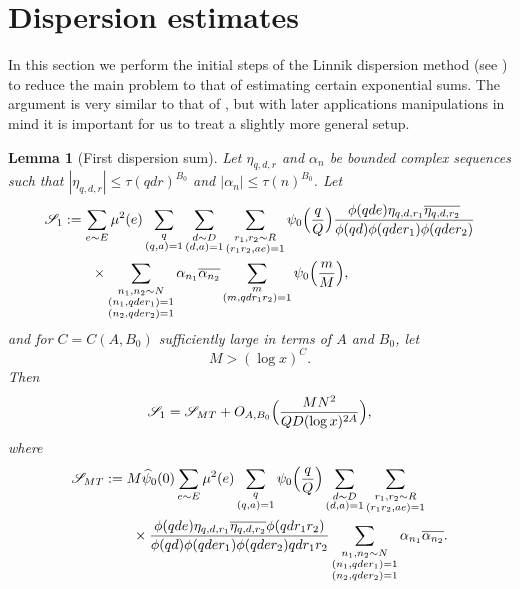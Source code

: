 \documentclass[10pt]{amsart}
\theoremstyle{plain}
\newtheorem{lmm}[thrm]{Lemma}
\numberwithin{equation}{section}
\renewcommand{\hat}[1]{\widehat #1}
\begin{document}
\section{Dispersion estimates}\label{sec:Dispersion}
%
%
%
%
In this section we perform the initial steps of the Linnik dispersion method (see \cite{Linnik}) to reduce the main problem to that of estimating certain exponential sums. The argument is very similar to that of \cite[\S3-\S7]{BFI1}, but with later applications manipulations in mind it is important for us to treat a slightly more general setup.
%
%
%
%
%
%
%
%
\begin{lmm}[First dispersion sum]\label{lmm:Dispersion1}
Let $\eta_{q,d,r}$ and $\alpha_n$ be bounded complex sequences such that $|\eta_{q,d,r}|\le \tau(q d r)^{B_0}$ and $|\alpha_n|\le \tau(n)^{B_0}$. Let
\begin{align*}
\mathscr{S}_{1}&:=\sum_{e\sim E}\mu^2(e) \sum_{\substack{q\\ (q,a)=1}}\sum_{\substack{d\sim D\\ (d,a)=1}}\sum_{\substack{r_1,r_2\sim R\\ (r_1r_2,a e)=1}}\psi_0\Bigl(\frac{q}{Q}\Bigr)\frac{\phi(q d e)\eta_{q,d,r_1}\overline{\eta_{q,d,r_2}} }{\phi(q d)\phi(q d e r_1)\phi(q d e r_2)}\\
&\qquad\times \sum_{\substack{n_1,n_2\sim N\\ (n_1,q d e r_1)=1\\(n_2,q d e r_2)=1}}\alpha_{n_1}\overline{\alpha_{n_2}}\sum_{\substack{m\\ (m,q d r_1 r_2)=1}} \psi_0\Bigl(\frac{m}{M}\Bigr),
\end{align*}
and for $C=C(A,B_0)$ sufficiently large in terms of $A$ and $B_0$, let
\[
M>(\log{x})^C.
\]
Then
\begin{equation*}
\mathscr{S}_{1}=\mathscr{S}_{MT}+O_{A,B_0}\Bigl(\frac{MN^2}{Q D(\log{x})^{2A}}\Bigr),\label{eq:S21Estimate}
\end{equation*}
where
\begin{align*}
\mathscr{S}_{MT}&:=M\hat{\psi}_0(0)\sum_{e\sim E}\mu^2(e)\sum_{\substack{q\\ (q,a)=1}}\psi_0\Bigl(\frac{q}{Q}\Bigr)\sum_{\substack{d\sim D\\ (d,a)=1}}\sum_{\substack{r_1,r_2\sim R\\ (r_1r_2,ae )=1}}\\
&\qquad\times\frac{\phi(q d e)\eta_{q,d,r_1}\overline{\eta_{q,d,r_2}} \phi(q d r_1r_2)}{\phi(q d)\phi(q d e r_1)\phi(q d e r_2)q d r_1r_2}\sum_{\substack{n_1,n_2\sim N\\ (n_1,q d e r_1)=1\\ (n_2,q d e r_2)=1}}\alpha_{n_1}\overline{\alpha_{n_2}}.
\end{align*}
\end{lmm}
\end{document}
